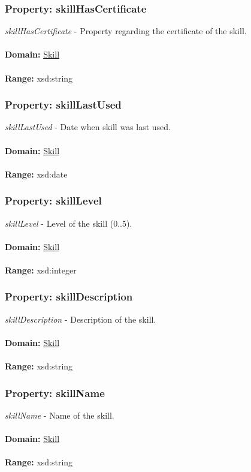 \documentclass[a4paper,12pt]{article}
\numberwithin{equation}{section}
\begin{document}
\subsubsection{Property: skillHasCertificate}\hypertarget{skillHasCertificate}{}
\textit{skillHasCertificate} - Property regarding the certificate of the skill.
\\\\
\textbf{Domain:} \hyperlink{Skill}{Skill} 
\\\\
\textbf{Range:}  xsd:string

\subsubsection{Property: skillLastUsed}\hypertarget{skillLastUsed}{}
\textit{skillLastUsed} - Date when skill was last used.
\\\\
\textbf{Domain:} \hyperlink{Skill}{Skill} 
\\\\
\textbf{Range:}  xsd:date

\subsubsection{Property: skillLevel}\hypertarget{skillLevel}{}
\textit{skillLevel} - Level of the skill (0..5).
\\\\
\textbf{Domain:} \hyperlink{Skill}{Skill} 
\\\\
\textbf{Range:}  xsd:integer

\subsubsection{Property: skillDescription}\hypertarget{skillDescription}{}
\textit{skillDescription} - Description of the skill.
\\\\
\textbf{Domain:} \hyperlink{Skill}{Skill} 
\\\\
\textbf{Range:}  xsd:string

\subsubsection{Property: skillName}\hypertarget{skillName}{}
\textit{skillName} - Name of the skill.
\\\\
\textbf{Domain:} \hyperlink{Skill}{Skill} 
\\\\
\textbf{Range:}  xsd:string
\end{document}
